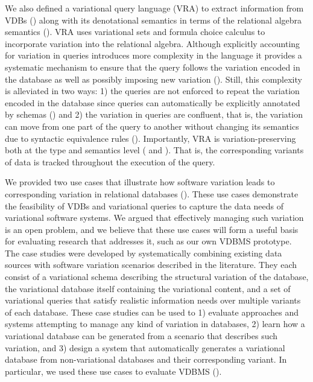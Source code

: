 We also defined a variational query language (VRA) to extract information from VDBs
() along with its denotational semantics in terms of the relational algebra 
semantics (). 
%
VRA uses variational sets and formula choice calculus to incorporate
variation into the relational algebra. Although explicitly accounting for variation
in queries introduces more complexity in the language it provides a systematic
mechanism to ensure that the query follows the variation encoded in the database
as well as possibly imposing new variation (). Still, this complexity
is alleviated in two ways: 1) the queries are not enforced to repeat the variation encoded in the 
database since queries can automatically be explicitly annotated by schemas ()
and 2) the variation in queries are confluent, that is, the variation can move from one 
part of the query to another without changing its semantics due to syntactic equivalence
rules (). 
%
Importantly, VRA is variation-preserving both at the type and semantics level
( and ). 
That is, the corresponding variants of data is tracked throughout the execution of
the query.

We provided two use cases that illustrate how software variation leads to
corresponding variation in relational databases (). 
These use cases demonstrate
the feasibility of VDBs and variational queries to capture the data needs of variational
software systems.
%
We argued that effectively managing such variation is an open problem, and we
believe that these use cases will form a useful basis for evaluating
research that addresses it, such as our own VDBMS prototype.
%
The case studies were developed by systematically combining existing data
sources with software variation scenarios described in the literature. They
each consist of a variational schema describing the structural variation of
the database, the variational database itself containing the variational
content, and a set of variational queries that satisfy realistic information
needs over multiple variants of each database.
% 
These case studies can be used to 1) evaluate approaches and systems
 attempting to manage any kind of variation in databases, 2) learn how a
 variational database can be generated from a scenario that describes such
 variation, and 3) design a system that automatically generates a variational
 database from non-variational databases and their corresponding variant. In
 particular, we used these use cases to evaluate VDBMS (). 


